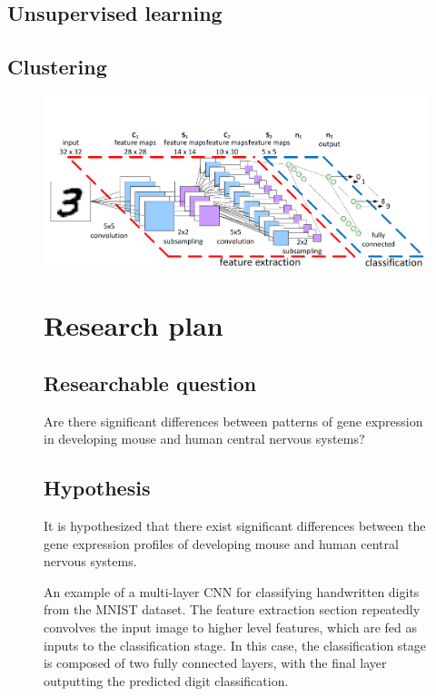 \documentclass[12pt,oneside,onecolumn,a4paper]{article}
\begin{document}
\subsection{Unsupervised learning}


\subsection{Clustering}

\begin{figure}[H]
\begin{center}
\includegraphics[width=0.8\columnwidth]{figures/CNN/CNN}
\caption{An example of a multi-layer CNN for classifying handwritten digits from the MNIST dataset. The feature extraction section repeatedly convolves the input image to higher level features, which are fed as inputs to the classification stage. In this case, the classification stage is composed of two fully connected layers, with the final layer outputting the predicted digit classification. \citep{peemen_mesman_corporaal_2011}%
}
\end{center}

\citep{yangCVPR2016joint}

\section{Research plan}


\subsection{Researchable question}
Are there significant differences between patterns of gene expression in developing mouse and human central nervous systems?

\subsection{Hypothesis}

It is hypothesized that there exist significant differences between the gene expression profiles of developing mouse and human central nervous systems.


\end{figure}
\end{document}
